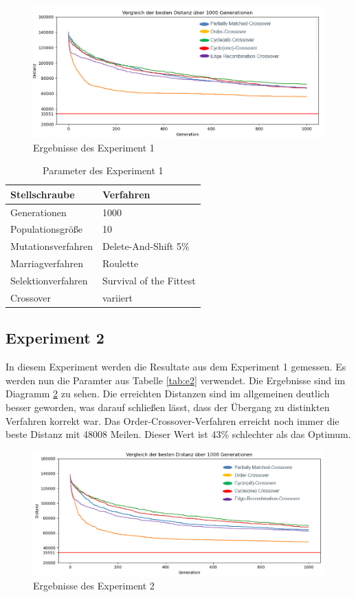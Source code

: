 \begin{figure}[H]
\centering
\includegraphics[width=1\textwidth]{img/Vortrag/experiment1.png}
\caption{Ergebnisse des Experiment 1}
\label{fig:experiment1}
\end{figure}

\begin{table}[H]
\centering
\caption{Parameter des Experiment 1}
\begin{tabular}{ll}
Stellschraube & Verfahren \\
\hline
Generationen & 1000 \\
Populationsgröße & 10 \\
Mutationsverfahren & Delete-And-Shift 5\% \\
Marriagverfahren & Roulette \\
Selektionverfahren & Survival of the Fittest \\
Crossover & variiert
\end{tabular}
\label{tab:e1}
\end{table}

\subsection{Experiment 2}
In diesem Experiment werden die Resultate aus dem Experiment 1 gemessen. Es werden nun die Paramter aus Tabelle \ref{tab:e2} verwendet. Die Ergebnisse sind im Diagramm \ref{fig:experiment2} zu sehen.
Die erreichten Distanzen sind im allgemeinen deutlich besser geworden, was darauf schließen lässt, dass der Übergang zu distinkten Verfahren korrekt war. Das Order-Crossover-Verfahren erreicht noch immer die beste Distanz mit 48008 Meilen. Dieser Wert ist 43\% schlechter als das Optimum.

\begin{figure}[H]
\centering
\includegraphics[width=1\textwidth]{img/Vortrag/experiment2.png}
\caption{Ergebnisse des Experiment 2}
\label{fig:experiment2}
\end{figure}

